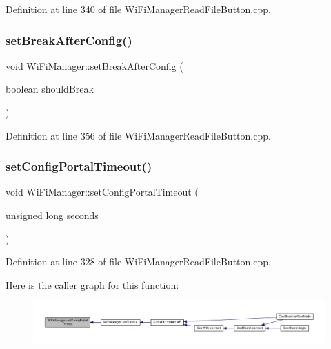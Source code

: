 Definition at line 340 of file Wi\+Fi\+Manager\+Read\+File\+Button.\+cpp.

\mbox{\label{class_wi_fi_manager_ad48fd74c893d12778121fa239d245cc9}} 
\subsubsection{\texorpdfstring{set\+Break\+After\+Config()}{setBreakAfterConfig()}}
{\footnotesize\ttfamily void Wi\+Fi\+Manager\+::set\+Break\+After\+Config (\begin{DoxyParamCaption}\item[{boolean}]{should\+Break }\end{DoxyParamCaption})}



Definition at line 356 of file Wi\+Fi\+Manager\+Read\+File\+Button.\+cpp.

\mbox{\label{class_wi_fi_manager_a904006cb4d2c769e93bfdef336853766}} 
\subsubsection{\texorpdfstring{set\+Config\+Portal\+Timeout()}{setConfigPortalTimeout()}}
{\footnotesize\ttfamily void Wi\+Fi\+Manager\+::set\+Config\+Portal\+Timeout (\begin{DoxyParamCaption}\item[{unsigned long}]{seconds }\end{DoxyParamCaption})}



Definition at line 328 of file Wi\+Fi\+Manager\+Read\+File\+Button.\+cpp.

Here is the caller graph for this function\+:\nopagebreak
\begin{figure}[H]
\begin{center}
\leavevmode
\includegraphics[width=350pt]{class_wi_fi_manager_a904006cb4d2c769e93bfdef336853766_icgraph}
\end{center}
\end{figure}
\mbox{\label{class_wi_fi_manager_a508fa98e77d165b29764f68d48b7a349}} 

